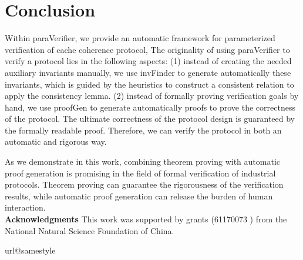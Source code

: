 \documentclass[conference]{IEEEtran}
\newcommand{\forget}[1]{}
\begin{document}
{%
\section{Conclusion }
\vspace{-5pt}
Within {\sf paraVerifier}, we provide an automatic framework for parameterized verification of cache coherence protocol,
The originality of using {\sf paraVerifier} to verify a protocol lies in the following aspects:
(1) instead of creating the needed auxiliary invariants manually, we use {\sf invFinder} to generate automatically these invariants, which is guided by the heuristics to construct a consistent relation to apply the consistency lemma.
(2) instead of formally proving verification goals by hand,
we use {\sf proofGen}  to generate automatically proofs to prove the correctness of the protocol. The ultimate correctness of the protocol design is guaranteed by the formally readable proof. Therefore, we can verify the protocol in both an automatic and rigorous way.

As we demonstrate in this work, combining theorem proving with
automatic proof generation is promising in the field of formal
verification of industrial protocols. Theorem proving can guarantee the rigorousness of the verification results,
while automatic proof generation can release the burden of human interaction.\\
{\bf Acknowledgments} This work was supported by grants
(61170073 ) from the National Natural Science Foundation of
China.
%
%
%
%

\begin{thebibliography}{50}
\providecommand{\url}[1]{#1}
\csname url@samestyle\endcsname
\providecommand{\newblock}{\relax}
\providecommand{\bibinfo}[2]{#2}
\providecommand{\BIBentrySTDinterwordspacing}{\spaceskip=0pt\relax}
\providecommand{\BIBentryALTinterwordstretchfactor}{4}
\providecommand{\BIBentryALTinterwordspacing}{\spaceskip=\fontdimen2\font plus
\BIBentryALTinterwordstretchfactor\fontdimen3\font minus
  \fontdimen4\font\relax}
\providecommand{\BIBforeignlanguage}[2]{{%
\expandafter\ifx\csname l@#1\endcsname\relax
\typeout{** WARNING: IEEEtran.bst: No hyphenation pattern has been}%
\typeout{** loaded for the language `#1'. Using the pattern for}%
\typeout{** the default language instead.}%
\else
\language=\csname l@#1\endcsname
\fi
#2}}
\providecommand{\BIBdecl}{\relax}
\BIBdecl



\end{thebibliography}}
\end{document}
